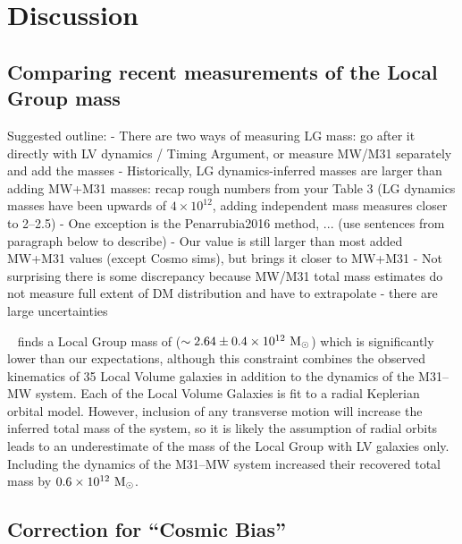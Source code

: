 \documentclass[twocolumn]{aastex631}
\begin{document}
\section{Discussion}
\label{sec:discussion}

\subsection{Comparing recent measurements of the Local Group mass}


Suggested outline:
- There are two ways of measuring LG mass: go after it directly with LV dynamics / Timing Argument, or measure MW/M31 separately and add the masses
- Historically, LG dynamics-inferred masses are larger than adding MW+M31 masses: recap rough numbers from your Table 3 (LG dynamics masses have been upwards of $4\times 10^{12}$, adding independent mass measures closer to 2--2.5)
- One exception is the Penarrubia2016 method, ... (use sentences from paragraph below to describe)
- Our value is still larger than most added MW+M31 values (except Cosmo sims), but brings it closer to MW+M31
- Not surprising there is some discrepancy because MW/M31 total mass estimates do not measure full extent of DM distribution and have to extrapolate - there are large uncertainties

~\cite{Penarrubia2016} finds a Local Group mass of ($\sim2.64\pm0.4\times
10^{12}~\mathrm{M}_\odot$) which is significantly lower than our expectations, although this
constraint combines the observed kinematics of 35 Local Volume galaxies in
addition to the dynamics of the M31--MW system.
Each of the Local Volume Galaxies is fit to a radial Keplerian orbital model.
However, inclusion of any transverse motion will increase the inferred total
mass of the system, so it is likely the assumption of radial orbits leads to
an underestimate of the mass of the Local Group with LV galaxies only.
Including the dynamics of the M31--MW system increased their recovered
total mass by $0.6\times10^{12}~\mathrm{M}_\odot$.

\subsection{Correction for ``Cosmic Bias''}
\end{document}
